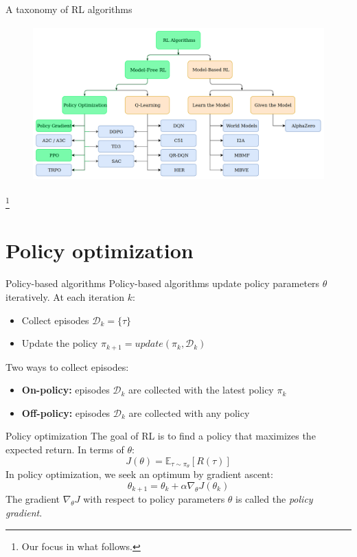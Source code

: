 \documentclass[10pt, aspectratio=1610]{beamer}
\newcommand\blfootnote[1]{%
  \begingroup
  \renewcommand\thefootnote{}%
  \footnote{#1}%
  \addtocounter{footnote}{-1}%
  \endgroup
}
\begin{document}
\begin{frame}{A taxonomy of RL algorithms}
    \begin{figure}
        \includegraphics[height=6cm]{figures/taxonomy-focus.png}
    \end{figure}
    \blfootnote{
        Our focus in what follows.
    }
\end{frame}

\section{Policy optimization}

\begin{frame}{Policy-based algorithms}
    Policy-based algorithms update policy parameters $\theta$ iteratively. At each iteration $k$:
    \begin{itemize}
        \item Collect episodes $\mathcal{D}_k = \{ \tau \}$
        \item Update the policy $\pi_{k+1} = \mathit{update}(\pi_k, \mathcal{D}_k)$
    \end{itemize}
    Two ways to collect episodes:
    \begin{itemize}
        \item \textbf{On-policy:} episodes $\mathcal{D}_k$ are collected with the latest policy $\pi_k$
        \item \textbf{Off-policy:} episodes $\mathcal{D}_k$ are collected with any policy
    \end{itemize}
\end{frame}

\begin{frame}{Policy optimization}
    The goal of RL is to find a policy that maximizes the expected return. In terms of $\theta$:
    $$
    J(\theta) = \mathbb{E}_{\tau \sim \pi_\theta}[R(\tau)]
    $$
    In policy optimization, we seek an optimum by gradient ascent:
    $$
    \theta_{k+1} = \theta_k + \alpha \nabla_\theta J(\theta_k)
    $$
    The gradient $\nabla_\theta J$ with respect to policy parameters $\theta$ is called the \emph{policy gradient}.
\end{frame}
\end{document}
